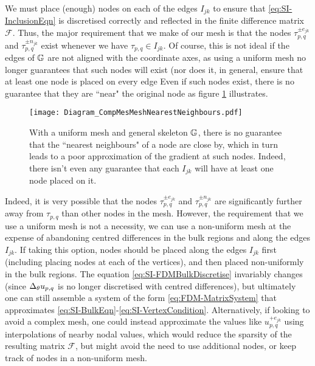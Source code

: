 We must place (enough) nodes on each of the edges $I_{jk}$ to ensure that \eqref{eq:SI-InclusionEqn} is discretised correctly and reflected in the finite difference matrix $\mathcal{F}$.
Thus, the major requirement that we make of our mesh is that the nodes $\tau_{p,q}^{\pm e_{jk}}$ and $\tau_{p,q}^{\pm n_{jk}}$ exist whenever we have $\tau_{p,q}\in I_{jk}$.
Of course, this is not ideal if the edges of $\mathbb{G}$ are not aligned with the coordinate axes, as using a uniform mesh no longer guarantees that such nodes will exist (nor does it, in general, ensure that at least one node is placed on every edge 
Even if such nodes exist, there is no guarantee that they are ``near" the original node as figure \ref{fig:Diagram_CompMesMeshNearestNeighbours} illustrates.
\begin{figure}
	\centering
	\texttt{[image: Diagram\_CompMesMeshNearestNeighbours.pdf]}
	\caption{\label{fig:Diagram_CompMesMeshNearestNeighbours} With a uniform mesh and general skeleton $\mathbb{G}$, there is no guarantee that the ``nearest neighbours" of a node are close by, which in turn leads to a poor approximation of the gradient at such nodes. Indeed, there isn't even any guarantee that each $I_{jk}$ will have at least one node placed on it.}
\end{figure}
Indeed, it is very possible that the nodes $\tau_{p,q}^{\pm e_{jk}}$ and $\tau_{p,q}^{\pm n_{jk}}$ are significantly further away from $\tau_{p,q}$ than other nodes in the mesh.
However, the requirement that we use a uniform mesh is not a necessity, we can use a non-uniform mesh at the expense of abandoning centred differences in the bulk regions and along the edges $I_{jk}$.
If taking this option, nodes should be placed along the edges $I_{jk}$ first (including placing nodes at each of the vertices), and then placed non-uniformly in the bulk regions.
The equation \eqref{eq:SI-FDMBulkDiscretise} invariably changes (since $\Delta_{\theta}u_{p,q}$ is no longer discretised with centred differences), but ultimately one can still assemble a system of the form \eqref{eq:FDM-MatrixSystem} that approximates \eqref{eq:SI-BulkEqn}-\eqref{eq:SI-VertexCondition}.
Alternatively, if looking to avoid a complex mesh, one could instead approximate the values like $u_{p,q}^{+e_{jk}}$ using interpolations of nearby nodal values, which would reduce the sparsity of the resulting matrix $\mathcal{F}$, but might avoid the need to use additional nodes, or keep track of nodes in a non-uniform mesh.

